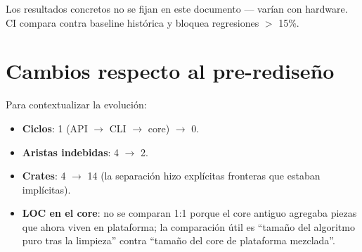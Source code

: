 Los resultados concretos no se fijan en este documento — varían
con hardware. CI compara contra baseline histórica y bloquea
regresiones $>$ 15\%.

\section{Cambios respecto al pre-rediseño}

Para contextualizar la evolución:

\begin{itemize}
    \item \textbf{Ciclos}: 1 (API $\to$ CLI $\to$ core) $\to$ 0.
    \item \textbf{Aristas indebidas}: 4 $\to$ 2.
    \item \textbf{Crates}: 4 $\to$ 14 (la separación hizo explícitas
    fronteras que estaban implícitas).
    \item \textbf{LOC en el core}: no se comparan 1:1 porque el
    core antiguo agregaba piezas que ahora viven en plataforma; la
    comparación útil es ``tamaño del algoritmo puro tras la
    limpieza'' contra ``tamaño del core de plataforma mezclada''.
\end{itemize}
